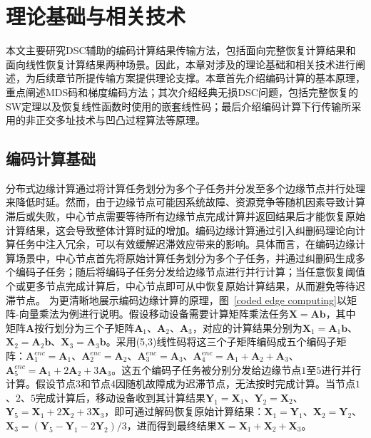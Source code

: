 \chapter{理论基础与相关技术}

本文主要研究DSC辅助的编码计算结果传输方法，包括面向完整恢复计算结果和面向线性恢复计算结果两种场景。因此，本章对涉及的理论基础和相关技术进行阐述，为后续章节所提传输方案提供理论支撑。本章首先介绍编码计算的基本原理，重点阐述MDS码和梯度编码方法；其次介绍经典无损DSC问题，包括完整恢复的SW定理以及恢复线性函数时使用的嵌套线性码；最后介绍编码计算下行传输所采用的非正交多址技术与凹凸过程算法等原理。



\section{编码计算基础}

分布式边缘计算通过将计算任务划分为多个子任务并分发至多个边缘节点并行处理来降低时延。然而，由于边缘节点可能因系统故障、资源竞争等随机因素导致计算滞后或失败，中心节点需要等待所有边缘节点完成计算并返回结果后才能恢复原始计算结果，这会导致整体计算时延的增加。编码边缘计算通过引入纠删码理论向计算任务中注入冗余，可以有效缓解迟滞效应带来的影响。具体而言，在编码边缘计算场景中，中心节点首先将原始计算任务划分为多个子任务，并通过纠删码生成多个编码子任务；随后将编码子任务分发给边缘节点进行并行计算；当任意恢复阈值个或更多节点完成计算后，中心节点即可从中恢复原始计算结果，从而避免等待迟滞节点。
为更清晰地展示编码边缘计算的原理，图~\ref{coded edge computing}以矩阵-向量乘法为例进行说明。假设移动设备需要计算矩阵乘法任务$\mathbf{X}=\mathbf{A}\mathbf{b}$，其中矩阵$\mathbf{A}$按行划分为三个子矩阵$\mathbf{A}_1$、$\mathbf{A}_2$、$\mathbf{A}_3$，对应的计算结果分别为$\mathbf{X}_1=\mathbf{A}_1\mathbf{b}$、$\mathbf{X}_2=\mathbf{A}_2\mathbf{b}$、$\mathbf{X}_3=\mathbf{A}_3\mathbf{b}$。采用(5,3)线性码将这三个子矩阵编码成五个编码子矩阵：$\mathbf{A}_1^{enc}=\mathbf{A}_1$、$\mathbf{A}_2^{enc}=\mathbf{A}_2$、$\mathbf{A}_3^{enc}=\mathbf{A}_3$、$\mathbf{A}_4^{enc}=\mathbf{A}_1+\mathbf{A}_2+\mathbf{A}_3$、$\mathbf{A}_5^{enc}=\mathbf{A}_1+2\mathbf{A}_2+3\mathbf{A}_3$。这五个编码子任务被分别分发给边缘节点$1$至$5$进行并行计算。假设节点$3$和节点$4$因随机故障成为迟滞节点，无法按时完成计算。当节点$1$、$2$、$5$完成计算后，移动设备收到其计算结果$\mathbf{Y}_1=\mathbf{X}_1$、$\mathbf{Y}_2=\mathbf{X}_2$、$\mathbf{Y}_5=\mathbf{X}_1+2\mathbf{X}_2+3\mathbf{X}_3$，即可通过解码恢复原始计算结果：$\mathbf{X}_1=\mathbf{Y}_1$、$\mathbf{X}_2=\mathbf{Y}_2$、$\mathbf{X}_3=(\mathbf{Y}_5-\mathbf{Y}_1-2\mathbf{Y}_2)/3$，进而得到最终结果$\mathbf{X}=\mathbf{X}_1+\mathbf{X}_2+\mathbf{X}_3$。


